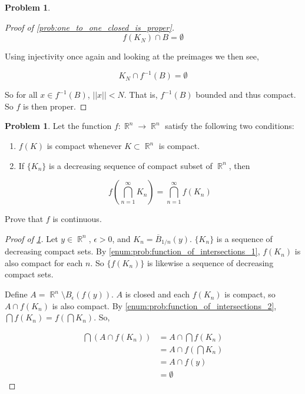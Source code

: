 \documentclass[english]{article}
\DeclareMathOperator{\R}{\mathbb{R}}
\newcommand{\inv}[1]{#1^{-1}}
\theoremstyle{definition}
\newtheorem{problem}[theorem]{Problem}
\begin{document}
\begin{problem}
\begin{proof}[Proof of \cref{prob:one_to_one_closed_is_proper}]
        \[
          f(K_N) \cap B = \emptyset  
        \]

        Using injectivity once again and looking at the preimages we then see,

        \[
          K_N \cap \inv{f}(B) = \emptyset  
        \]

        So for all $x \in \inv{f}(B)$, $||x|| < N$. That is, $\inv{f}(B)$ bounded and thus compact. So $f$ is then proper.
    \end{proof}
\end{problem}

\begin{problem}
    \label{prob:function_of_intersections}
    Let the function $f: \R^n \to \R^n$ satisfy the following two conditions:
    
    \begin{enumerate}
        \item \label{enum:prob:function_of_intersections_1} $f(K)$ is compact whenever $K \subset \R^n$ is compact.
        \item \label{enum:prob:function_of_intersections_2} If $\{K_n\}$ is a decreasing sequence of compact subset of $\R^n$, then 
        
        \[
            f\left(\bigcap_{n = 1}^{\infty} K_n \right) = \bigcap_{n = 1}^{\infty} f(K_n)
        \]
    \end{enumerate}

    Prove that $f$ is continuous.

    \begin{proof}[Proof of \cref{prob:function_of_intersections}]
        Let $y \in \R^n$, $\epsilon > 0$, and $K_n = \overline{B}_{1/n}(y)$. $\{K_n\}$ is a sequence of decreasing compact sets. By \cref{enum:prob:function_of_intersections_1}, $f(K_n)$ is also compact for each $n$. So $\{f(K_n)\}$ is likewise a sequence of decreasing compact sets. 

        Define $A = \R^n \setminus B_{\epsilon}(f(y))$. $A$ is closed and each $f(K_n)$ is compact, so $A \cap f(K_n)$ is also compact. By \cref{enum:prob:function_of_intersections_2}, $\bigcap f(K_n) = f\left(\bigcap K_n \right)$. So,

        \begin{align*}
            \bigcap \left(A \cap f(K_n)\right)
            & = A \cap \bigcap f(K_n) \\
            & = A \cap f\left(\bigcap K_n \right) \\
            & = A \cap f(y) \\
            & = \emptyset
        \end{align*}


\end{proof}
\end{problem}
\end{document}
